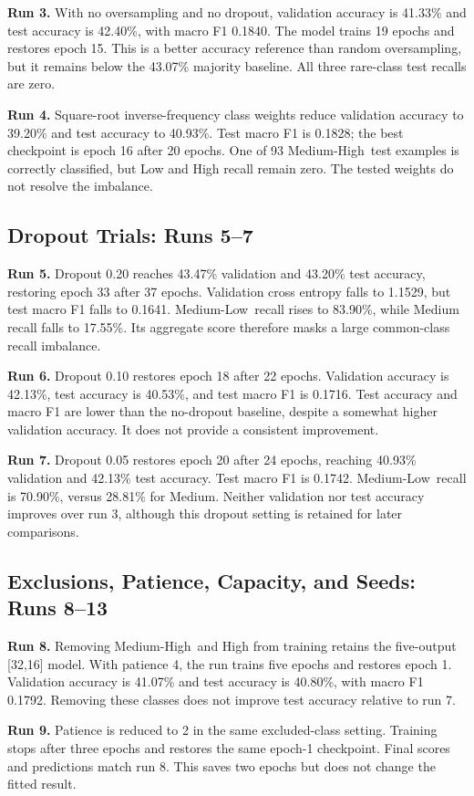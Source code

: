 \documentclass[11pt,letterpaper]{article}
\newcommand{\ML}{Medium-Low}
\newcommand{\MH}{Medium-High}
\newcommand{\run}[1]{\textbf{Run #1.}}
\begin{document}
\run{3} With no oversampling and no dropout, validation accuracy is 41.33\% and test accuracy is 42.40\%, with macro F1 0.1840. The model trains 19 epochs and restores epoch 15. This is a better accuracy reference than random oversampling, but it remains below the 43.07\% majority baseline. All three rare-class test recalls are zero.

\run{4} Square-root inverse-frequency class weights reduce validation accuracy to 39.20\% and test accuracy to 40.93\%. Test macro F1 is 0.1828; the best checkpoint is epoch 16 after 20 epochs. One of 93 \MH\ test examples is correctly classified, but Low and High recall remain zero. The tested weights do not resolve the imbalance.

\subsection{Dropout Trials: Runs 5--7}
\run{5} Dropout 0.20 reaches 43.47\% validation and 43.20\% test accuracy, restoring epoch 33 after 37 epochs. Validation cross entropy falls to 1.1529, but test macro F1 falls to 0.1641. \ML\ recall rises to 83.90\%, while Medium recall falls to 17.55\%. Its aggregate score therefore masks a large common-class recall imbalance.

\run{6} Dropout 0.10 restores epoch 18 after 22 epochs. Validation accuracy is 42.13\%, test accuracy is 40.53\%, and test macro F1 is 0.1716. Test accuracy and macro F1 are lower than the no-dropout baseline, despite a somewhat higher validation accuracy. It does not provide a consistent improvement.

\run{7} Dropout 0.05 restores epoch 20 after 24 epochs, reaching 40.93\% validation and 42.13\% test accuracy. Test macro F1 is 0.1742. \ML\ recall is 70.90\%, versus 28.81\% for Medium. Neither validation nor test accuracy improves over run 3, although this dropout setting is retained for later comparisons.

\subsection{Exclusions, Patience, Capacity, and Seeds: Runs 8--13}
\run{8} Removing \MH\ and High from training retains the five-output [32,16] model. With patience 4, the run trains five epochs and restores epoch 1. Validation accuracy is 41.07\% and test accuracy is 40.80\%, with macro F1 0.1792. Removing these classes does not improve test accuracy relative to run 7.

\run{9} Patience is reduced to 2 in the same excluded-class setting. Training stops after three epochs and restores the same epoch-1 checkpoint. Final scores and predictions match run 8. This saves two epochs but does not change the fitted result.
\end{document}
